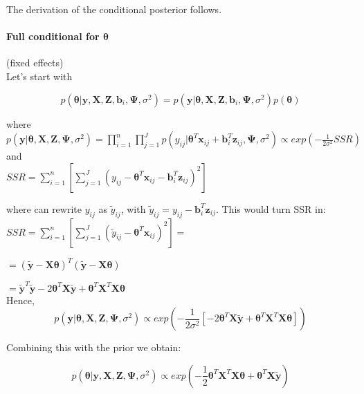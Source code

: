 \documentclass[a4paper]{article}
\begin{document}
\vspace{5mm}

The derivation of the conditional posterior follows.

\paragraph{Full conditional for $\bm{\theta}$}(fixed effects) \\

Let's start with

\begin{equation}
	p(\bm{\theta}|\bm{y}, \bm{X}, \bm{Z}, \bm{b}_{i}, \bm{\Psi}, \sigma^2) = 	p(\bm{y}|\bm{\theta}, \bm{X}, \bm{Z}, \bm{b}_{i}, \bm{\Psi}, \sigma^2) p(\bm{\theta})
\end{equation}

where\\

$p(\bm{y}|\bm{\theta}, \bm{X}, \bm{Z}, \bm{\Psi}, \sigma^2) = \prod_{i=1}^n \prod_{j=1}^Jp(y_{ij}|\bm{\theta}^{T}\bm{x}_{ij} + \bm{b}_{i}^{T}\bm{z}_{ij}, \bm{\Psi}, \sigma^2) \propto exp(-\frac{1}{2\sigma^2}SSR)$ \\

and\\

$SSR = \sum_{i = 1}^{n}[\sum_{j = 1}^{J}( y_{ij}-\bm{\theta}^{T}\bm{x}_{ij} - \bm{b}_{i}^{T}\bm{z}_{ij})^2]$

where can rewrite $y_{ij}$ as $\tilde{y}_{ij}$, with $\tilde{y}_{ij} = y_{ij} - \bm{b}^{T}_{i}\bm{z}_{ij}$. This would turn SSR in:\\

$SSR = \sum_{i = 1}^{n}[\sum_{j = 1}^{J}( \tilde{y}_{ij}-\bm{\theta}^{T}\bm{x}_{ij})^2 ] =$

$= ( \tilde{\bm{y}} - \bm{X}\bm{\theta} )^{T}( \tilde{\bm{y}} - \bm{X}\bm{\theta} )$

$ = \tilde{\bm{y}}^{T}\tilde{\bm{y}} - 2\bm{\theta}^{T}\bm{X}\tilde{\bm{y}} + \bm{\theta}^{T}\bm{X}^{T}\bm{X}\bm{\theta}$\\

Hence,
\begin{equation}
p(\bm{y}|\bm{\theta}, \bm{X}, \bm{Z}, \bm{\Psi}, \sigma^2) \propto exp(-\frac{1}{2\sigma^2}[- 2\bm{\theta}^{T}\bm{X}\tilde{\bm{y}} + \bm{\theta}^{T}\bm{X}^{T}\bm{X}\bm{\theta}])
\end{equation}


Combining this with the prior we obtain:

\begin{equation}
	p(\bm{\theta}|\bm{y}, \bm{X}, \bm{Z}, \bm{\Psi}, \sigma^2) \propto exp(-\frac{1}{2}\bm{\theta}^{T}\bm{X}^{T}\bm{X}\bm{\theta} + \bm{\theta}^{T}\bm{X}\tilde{\bm{y}})
\end{equation}
\end{document}
